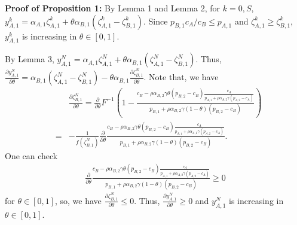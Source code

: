 \documentclass[nonblindrev,copyedit]{informs1}
\begin{document}
\begin{APPENDICES}
{\bf Proof of Proposition 1: } By Lemma 1 and Lemma 2, for $k = 0, S$, $y^k_{A,1} = \alpha_{A,1} \zeta^k_{A,1} + \theta \alpha_{B,1} (\zeta^k_{A,1} - \zeta^k_{B,1})$. Since $p_{B,1} c_A/c_B \leq p_{A,1}$ and $\zeta^k_{A,1} \geq \zeta^k_{B,1}$, $y^k_{A,1}$ is increasing in $\theta \in [0,1]$.

By Lemma 3, $y^N_{A,1} = \alpha_{A,1} \zeta^N_{A,1} + \theta \alpha_{B,1} (\zeta^N_{A,1} - \zeta^N_{B,1})$. Thus, $ \frac{\partial y^{N}_{A,1}}{\partial \theta} = \alpha_{B,1} (\zeta^N_{A,1} - \zeta^N_{B,1}) - \theta \alpha_{B,1} \frac{\partial \zeta^N_{B,1}}{\partial \theta}$. Note that, we have
\begin{eqnarray}
    &  & \frac{\partial \zeta^N_{B,1}}{\partial \theta}
      = \frac{\partial }{\partial \theta} F^{-1}\left( 1- \frac{c_B - \rho \alpha_{B,2} \gamma \theta (p_{B,2}-c_B)  \frac{c_A}{p_{A,1} +  \rho \alpha_{A,2} \gamma (p_{A,2}-c_A)}}{p_{B,1} + \rho \alpha_{B,2} \gamma (1-\theta)(p_{B,2} -c_B)} \right) \nonumber \\
    & = & - \frac{1}{f\left( \zeta^N_{B,1} \right)} \frac{\partial}{\partial \theta} \frac{c_B - \rho \alpha_{B,2} \gamma \theta (p_{B,2}-c_B)  \frac{c_A}{p_{A,1} +  \rho \alpha_{A,2} \gamma (p_{A,2}-c_A)}}{p_{B,1} + \rho \alpha_{B,2} \gamma (1-\theta)(p_{B,2} -c_B)}. \label{ineq:derybn}
\end{eqnarray}
One can check
\begin{eqnarray} \label{ineq:sbn}
    \frac{\partial}{\partial \theta} \frac{c_B - \rho \alpha_{B,2} \gamma \theta (p_{B,2}-c_B)  \frac{c_A}{p_{A,1} +  \rho \alpha_{A,2} \gamma (p_{A,2}-c_A)}}{p_{B,1} + \rho \alpha_{B,2} \gamma (1-\theta)(p_{B,2} -c_B)}
    \geq 0
\end{eqnarray}
for $\theta \in [0,1]$, so, we have $\frac{\partial \zeta^N_{B,1}}{\partial \theta} \leq 0$. Thus, $\frac{\partial y^N_{A,1}}{\partial \theta} \geq 0$ and $y^N_{A,1}$ is increasing in $\theta \in [0,1]$.


\end{APPENDICES}
\end{document}
